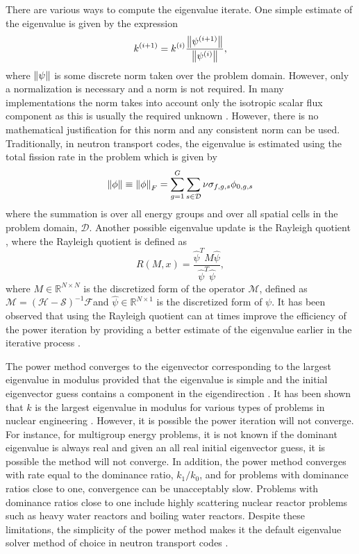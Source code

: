 There are various ways to compute the eigenvalue iterate. One simple estimate of the eigenvalue is given by the expression
\begin{equation}
k^{(i+1)} = k^{(i)} \frac{ \left\lVert\psi^{(i+1)}\right\rVert}{\left\lVert\psi^{(i)}\right\rVert},
\end{equation}
where $\left\lVert\psi\right\rVert$ is some discrete norm taken over the problem domain. However, only a normalization is necessary and a norm is not required. In many implementations the norm takes into account only the isotropic scalar flux component as this is usually the required unknown \cite{warsa2004krylov}. However, there is no mathematical justification for this norm and any consistent norm can be used. Traditionally, in neutron transport codes, the eigenvalue is estimated using the total fission rate in the problem \cite{warsa2004krylov} which is given by 
\begin{equation}
	\left\lVert\phi\right\rVert \equiv \left\lVert\phi\right\rVert_{F} = \sum_{g=1}^{G} \sum_{s \in \mathcal{D}} \nu \sigma_{f,g,s} \phi_{0,g,s}
\end{equation}
where the summation is over all energy groups and over all spatial cells in the problem domain, $\mathcal{D}$. Another possible eigenvalue update is the Rayleigh quotient \cite{horn_matrix_2012}, where the Rayleigh quotient is defined as
\begin{equation}
	R(M,x) = \frac{\hat{\psi}^{T}M\hat{\psi}}{\hat{\psi}^{T}\hat{\psi}},
\end{equation}
where $M \in \mathbb{R}^{N \times N}$ is the discretized form of the operator $\mathcal{M}$, defined as $\mathcal{M} = (\mathcal{H} - \mathcal{S})^{-1} \mathcal{F}$and $\hat{\psi} \in \mathbb{R}^{N \times 1}$ is the discretized form of $\psi$. It has been observed that using the Rayleigh quotient can at times improve the efficiency of the power iteration by providing a better estimate of the eigenvalue earlier in the iterative process \cite{warsa2004krylov}.

The power method converges to the eigenvector corresponding to the largest eigenvalue in modulus provided that the eigenvalue is simple and the initial eigenvector guess contains a component in the eigendirection \cite{golub_matrix_2012}. It has been shown that $k$ is the largest eigenvalue in modulus for various types of problems in nuclear engineering \cite{modak_evaluation_1995}. However, it is possible the power iteration will not converge. For instance, for multigroup energy problems, it is not known if the dominant eigenvalue is always real and given an all real initial eigenvector guess, it is possible the method will not converge. In addition, the power method converges with rate equal to the dominance ratio, $k_{1}/k_{0}$, and for problems with dominance ratios close to one, convergence can be unacceptably slow. Problems with dominance ratios close to one include highly scattering nuclear reactor problems such as heavy water reactors and boiling water reactors. Despite these limitations, the simplicity of the power method makes it the default eigenvalue solver method of choice in neutron transport codes \cite{duderstadt_nuclear_1976}.


